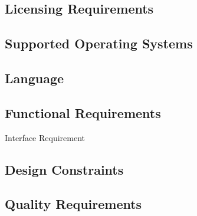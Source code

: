 \subsection{Licensing Requirements}
\label{requirements:license}

\subsection{Supported Operating Systems}
\label{requirements:os}

\subsection{Language}
\label{requirements:language}


\subsection{Functional Requirements} %
\label{requirements:functional}

\begin{requirement}{Interface Requirement}
\end{requirement}



\subsection{Design Constraints}
\label{requirements:constraints}

\subsection{Quality Requirements}
\label{requirements:quality}


